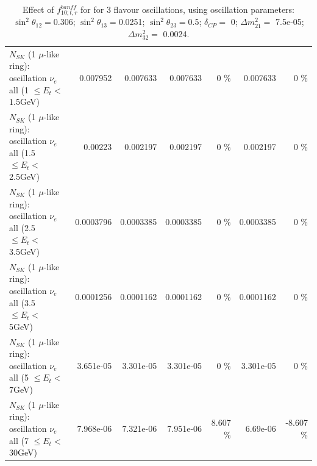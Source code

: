 \begin{table}
\begin{tabular}{| l | r | r | r  r | r  r |}
$N_{SK}$ (1 $\mu$-like ring): oscillation $\nu_{e}$ all (1 $\leq E_{t} <$ 1.5GeV) &        0.007952 &        0.007633 &        0.007633 &        0 \%  &        0.007633 &        0 \%  \\ 
$N_{SK}$ (1 $\mu$-like ring): oscillation $\nu_{e}$ all (1.5 $\leq E_{t} <$ 2.5GeV) &         0.00223 &        0.002197 &        0.002197 &        0 \%  &        0.002197 &        0 \%  \\ 
$N_{SK}$ (1 $\mu$-like ring): oscillation $\nu_{e}$ all (2.5 $\leq E_{t} <$ 3.5GeV) &       0.0003796 &       0.0003385 &       0.0003385 &        0 \%  &       0.0003385 &        0 \%  \\ 
$N_{SK}$ (1 $\mu$-like ring): oscillation $\nu_{e}$ all (3.5 $\leq E_{t} <$ 5GeV) &       0.0001256 &       0.0001162 &       0.0001162 &        0 \%  &       0.0001162 &        0 \%  \\ 
 $N_{SK}$ (1 $\mu$-like ring): oscillation $\nu_{e}$ all (5 $\leq E_{t} <$ 7GeV) &       3.651e-05 &       3.301e-05 &       3.301e-05 &        0 \%  &       3.301e-05 &        0 \%  \\ 
$N_{SK}$ (1 $\mu$-like ring): oscillation $\nu_{e}$ all (7 $\leq E_{t} <$ 30GeV) &       7.968e-06 &       7.321e-06 &       7.951e-06 &    8.607 \%  &        6.69e-06 &   -8.607 \%  \\ 
\hline
\hline
\end{tabular}
\caption{ Effect of $f_{10; t, r}^{banff}$ for for 3 flavour oscillations, using oscillation parameters:  $\sin^2\theta_{12} = $0.306; $\sin^2\theta_{13} = $0.0251; $\sin^2\theta_{23} = $0.5; $\delta_{CP} = $        0; $\Delta m^2_{21} = $    7.5e-05; $\Delta m^2_{32} = $    0.0024. }
\label{tab:num_banff_10_1RmuT_3f_osc_t13:0.0251}
\end{table}
\clearpage
